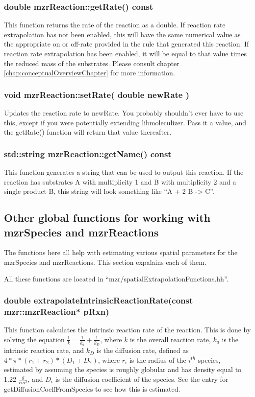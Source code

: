 \subsubsection{double mzrReaction::getRate() const}
This function returns the rate of the reaction as a double.  If
reaction rate extrapolation has not been enabled, this will have the
same numerical value as the appropriate on or off-rate provided in the
rule that generated this reaction.  If reaction rate extrapolation has
been enabled, it will be equal to that value times the reduced mass of
the substrates.  Please consult chapter
\ref{chap:conceptualOverviewChapter} for more information.

\subsubsection{void mzrReaction::setRate( double newRate )}
Updates the reaction rate to newRate.  You probably shouldn't ever
have to use this, except if you were potentially extending
libmoleculizer.  Pass it a value, and the getRate() function will
return that value thereafter.  

\subsubsection{std::string mzrReaction::getName() const}
This function generates a string that can be used to output this
reaction.  If the reaction has substrates A with multiplicity 1 and B
with multiplicity 2 and a single product B, this string will look
something like ``A + 2 B -> C''.

\subsection{Other global functions for working with mzrSpecies and mzrReactions}
The functions here all help with estimating various spatial parameters
for the mzrSpecies and mzrReactions.  This section expalains each of
them.  

All these functions are located in ``mzr/spatialExtrapolationFunctions.hh''.

\subsubsection{double extrapolateIntrinsicReactionRate(const
  mzr::mzrReaction* pRxn)}

This function calculates the intrinsic reaction rate of the reaction.
This is done by solving the equation $\frac{1}{k} = \frac{1}{k_a} +
\frac{1}{k_D}$, where $k$ is the overall reaction rate, $k_a$ is the
intrinsic reaction rate, and $k_D$ is the diffusion rate, defined as
$4 * \pi * (r_1 + r_2) * (D_1 + D_2)$, where $r_i$ is the radius of
the $i^{th}$ species, estimated by assuming the species is roughly
globular and has density equal to 1.22 $\frac{g}{cm^3}$, and $D_i$ is
the diffusion coefficient of the species.  See the entry for
getDiffusionCoeffFromSpecies to see how this is estimated.
    
